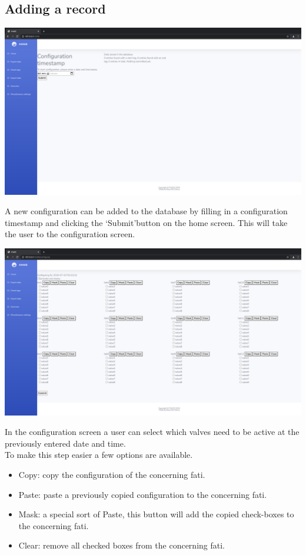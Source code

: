 \documentclass[12pt]{article}
\begin{document}
\subsection{Adding a record}
\begin{center}
	\includegraphics[width=\linewidth]{images/Home_screen_no_data.png}
\end{center}
A new configuration can be added to the database by filling in a configuration timestamp and clicking the \lq Submit\rq button on the home screen. This will take the user to the configuration screen.\\
\begin{center}
	\includegraphics[width=\linewidth]{images/Empty_config_screen.png}
\end{center}
In the configuration screen a user can select which valves need to be active at the previously entered date and time.\\
To make this step easier a few options are available.
\begin{itemize}
	\item Copy: copy the configuration of the concerning fati.
	\item Paste: paste a previously copied configuration to the concerning fati.
	\item Mask: a special sort of Paste, this button will add the copied check-boxes to the concerning fati.
	\item Clear: remove all checked boxes from the concerning fati.
\end{itemize}
\end{document}
